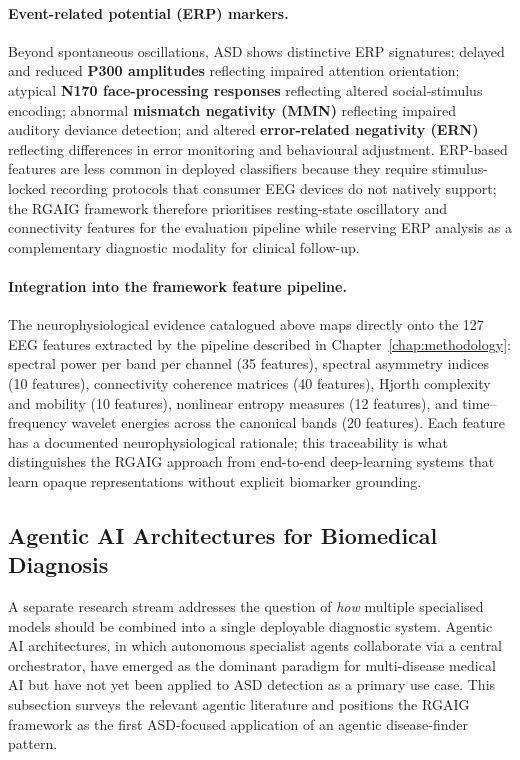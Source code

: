 \paragraph{Event-related potential (ERP) markers.}
Beyond spontaneous oscillations, ASD shows distinctive ERP signatures: delayed and reduced \textbf{P300 amplitudes} reflecting impaired attention orientation; atypical \textbf{N170 face-processing responses} reflecting altered social-stimulus encoding; abnormal \textbf{mismatch negativity (MMN)} reflecting impaired auditory deviance detection; and altered \textbf{error-related negativity (ERN)} reflecting differences in error monitoring and behavioural adjustment. ERP-based features are less common in deployed classifiers because they require stimulus-locked recording protocols that consumer EEG devices do not natively support; the RGAIG framework therefore prioritises resting-state oscillatory and connectivity features for the evaluation pipeline while reserving ERP analysis as a complementary diagnostic modality for clinical follow-up.

\paragraph{Integration into the framework feature pipeline.}
The neurophysiological evidence catalogued above maps directly onto the 127 EEG features extracted by the pipeline described in Chapter~\ref{chap:methodology}: spectral power per band per channel (35 features), spectral asymmetry indices (10 features), connectivity coherence matrices (40 features), Hjorth complexity and mobility (10 features), nonlinear entropy measures (12 features), and time--frequency wavelet energies across the canonical bands (20 features). Each feature has a documented neurophysiological rationale; this traceability is what distinguishes the RGAIG approach from end-to-end deep-learning systems that learn opaque representations without explicit biomarker grounding.

\subsection{Agentic AI Architectures for Biomedical Diagnosis}
\label{subsec:agentic_asd}

A separate research stream addresses the question of \emph{how} multiple specialised models should be combined into a single deployable diagnostic system. Agentic AI architectures, in which autonomous specialist agents collaborate via a central orchestrator, have emerged as the dominant paradigm for multi-disease medical AI but have not yet been applied to ASD detection as a primary use case. This subsection surveys the relevant agentic literature and positions the RGAIG framework as the first ASD-focused application of an agentic disease-finder pattern.

